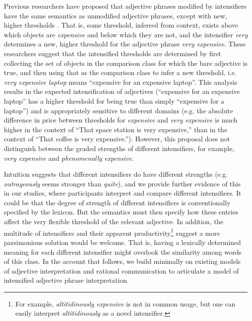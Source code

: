 \documentclass[10pt,letterpaper]{article}
\newcommand{\w}[1]{\emph{#1}}
\begin{document}
Previous researchers have proposed that adjective phrases modified by intensifiers have the same semantics as unmodified adjective phrases, except with new, higher thresholds \cite{kennedy_scale_2005, klein_semantics_1980, wheeler_attributives_1972}.
That is, some threshold, inferred from context, exists above which objects are \w{expensive} and below which they are not, and the intensifier \w{very} determines a new, higher threshold for the adjective phrase \w{very expensive}.
These researchers suggest that the intensified thresholds are determined by first collecting the set of objects in the comparison class for which the bare adjective is true, and then using that as the comparison class to infer a new threshold, i.e. \w{very expensive laptop} means ``expensive for an expensive laptop''.
This analysis results in the expected intensification of adjectives (``expensive for an expensive laptop'' has a higher threshold for being true than simply ``expensive for a laptop'') and is appropriately sensitive to different domains (e.g. the absolute difference in price between thresholds for \w{expensive} and \w{very expensive} is much higher in the context of ``That space station is very expensive,'' than in the context of ``That coffee is very expensive.'').
However, this proposal does not distinguish between the graded strengths of different intensifiers, for example, \w{very expensive} and \w{phenomenally expensive}.

Intuition suggests that different intensifiers do have different strengths (e.g. \w{outrageously} seems stronger than \w{quite}), and we provide further evidence of this in our studies, where participants interpret and compare different intensifiers.
It could be that the degree of strength of different intensifiers is conventionally specified by the lexicon. But the semantics must then specify how these entries affect the very flexible threshold of the relevant adjective.
In addition, the multitude of intensifiers \cite{bolinger_degree_1972} and their apparent productivity\footnote{For example, \w{altitidinously expensive} is not in common usage, but one can easily interpret \w{altitidinously} as a novel intensifier.}
suggest a more parsimonious solution would be welcome. 
That is, having a lexically determined meaning for each different intensifier might overlook the similarity among words of this class.
In the account that follows, we build minimally on existing models of adjective interpretation and rational communication to articulate a model of intensified adjective phrase interpretation.
\end{document}
